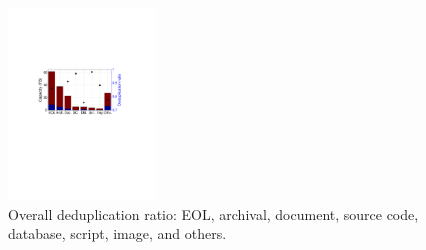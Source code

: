 \begin{figure} 
	\centering
	\includegraphics[width=0.35\textwidth]{graphs/dedup-overall} 
	\caption{Overall deduplication ratio: EOL, archival, document, source code, database, script, image, and others.} 
	\label{fig:dedup-overall} 
\end{figure}